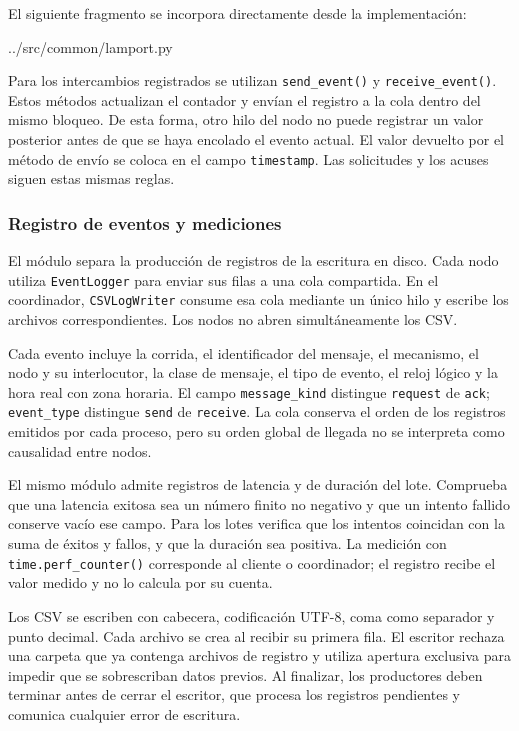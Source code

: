 El siguiente fragmento se incorpora directamente desde la implementación:


    {../src/common/lamport.py}

Para los intercambios registrados se utilizan \texttt{send\_event()} y
\texttt{receive\_event()}. Estos métodos actualizan el contador y envían el
registro a la cola dentro del mismo bloqueo. De esta forma, otro hilo del nodo
no puede registrar un valor posterior antes de que se haya encolado el evento
actual. El valor devuelto por el método de envío se coloca en el campo
\texttt{timestamp}. Las solicitudes y los acuses siguen estas mismas reglas.

\subsubsection{Registro de eventos y mediciones}

El módulo  separa la producción de registros de la
escritura en disco. Cada nodo utiliza \texttt{EventLogger} para enviar sus filas
a una cola compartida. En el coordinador, \texttt{CSVLogWriter} consume esa cola
mediante un único hilo y escribe los archivos correspondientes. Los nodos no
abren simultáneamente los CSV.

Cada evento incluye la corrida, el identificador del mensaje, el mecanismo,
el nodo y su interlocutor, la clase de mensaje, el tipo de evento, el reloj lógico
y la hora real con zona horaria. El campo \texttt{message\_kind} distingue
\texttt{request} de \texttt{ack}; \texttt{event\_type} distingue \texttt{send} de
\texttt{receive}. La cola conserva el orden de los registros emitidos por cada
proceso, pero su orden global de llegada no se interpreta como causalidad entre
nodos.

El mismo módulo admite registros de latencia y de duración del lote. Comprueba
que una latencia exitosa sea un número finito no negativo y que un intento
fallido conserve vacío ese campo. Para los lotes verifica que los intentos
coincidan con la suma de éxitos y fallos, y que la duración sea positiva. La
medición con \texttt{time.perf\_counter()} corresponde al cliente o coordinador;
el registro recibe el valor medido y no lo calcula por su cuenta.

Los CSV se escriben con cabecera, codificación UTF-8, coma como separador y punto
decimal. Cada archivo se crea al recibir su primera fila. El escritor rechaza
una carpeta que ya contenga archivos de registro y utiliza apertura exclusiva
para impedir que se sobrescriban datos previos. Al finalizar, los productores
deben terminar antes de cerrar el escritor, que procesa los registros pendientes
y comunica cualquier error de escritura.

